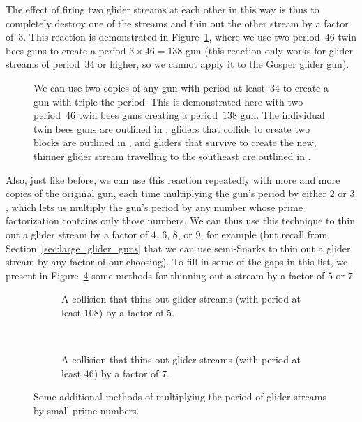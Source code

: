 \noindent The effect of firing two glider streams at each other in this way is thus to completely destroy one of the streams and thin out the other stream by a factor of~$3$. This reaction is demonstrated in Figure~\ref{fig:p138_gun}, where we use two period~$46$ twin bees guns to create a period $3 \times 46 = 138$ gun (this reaction only works for glider streams of period~$34$ or higher, so we cannot apply it to the Gosper glider gun).
\begin{figure}[!htb]
	\centering
	\caption{We can use two copies of any gun with period at least~$34$ to create a gun with triple the period. This is demonstrated here with two period~$46$ twin bees guns creating a period~$138$ gun. The individual twin bees guns are outlined in , gliders that collide to create two blocks are outlined in , and gliders that survive to create the new, thinner glider stream travelling to the southeast are outlined in .}\label{fig:p138_gun}
\end{figure}

Also, just like before, we can use this reaction repeatedly with more and more copies of the original gun, each time multiplying the gun's period by either $2$ or $3$, which lets us multiply the gun's period by any number whose prime factorization contains only those numbers. We can thus use this technique to thin out a glider stream by a factor of $4$, $6$, $8$, or $9$, for example (but recall from Section~\ref{sec:large_glider_guns} that we can use semi-Snarks to thin out a glider stream by any factor of our choosing). To fill in some of the gaps in this list, we present in Figure~\ref{fig:glider_delete_prime} some methods for thinning out a stream by a factor of $5$ or $7$.

\begin{figure}[!htb]
	\centering
	\begin{subfigure}{.48\textwidth}
		\centering
		\caption{A collision that thins out glider streams (with period at least $108$) by a factor of $5$.}
		\label{fig:glider_delete4}
	\end{subfigure} \ \ \ \ %
	\begin{subfigure}{.48\textwidth}
		\centering
		\caption{A collision that thins out glider streams (with period at least $46$) by a factor of $7$.}
		\label{fig:glider_delete6}
	\end{subfigure}
	\caption{Some additional methods of multiplying the period of glider streams by small prime numbers.}\label{fig:glider_delete_prime}
\end{figure}


